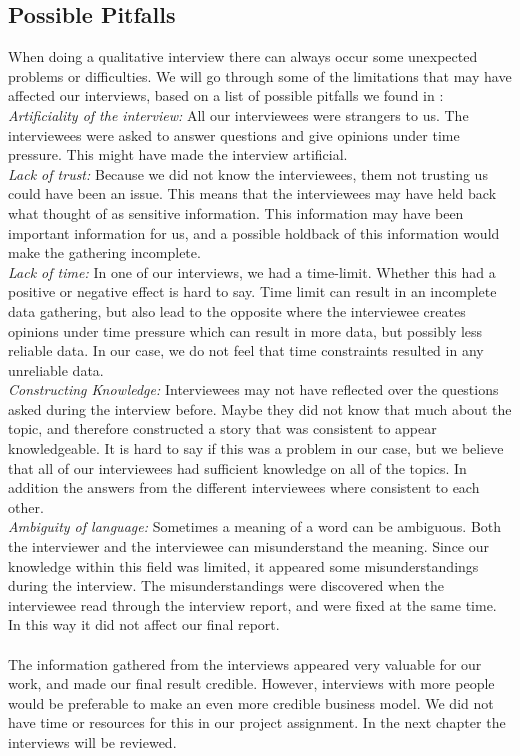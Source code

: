\subsection{Possible Pitfalls}
When doing a qualitative interview there can always occur some unexpected problems or difficulties. We will go through some of the limitations that may have affected our interviews, based on a list of possible pitfalls we found in \cite{interview}:\\
\emph{Artificiality of the interview:} All our interviewees were strangers to us. The interviewees were asked to answer questions  and give opinions under time pressure. This might have made the interview artificial. \\
\emph{Lack of trust:} Because we did not know the interviewees, them not trusting us could have been an issue. This means that the interviewees may have held back what thought of as sensitive information. This information may have been important information for us, and a possible holdback of this information would make the gathering incomplete. \\
\emph{Lack of time:} In one of our interviews, we had a time-limit. Whether this had a positive or negative effect is hard to say. Time limit can result in an incomplete data gathering, but also lead to the opposite where the interviewee creates opinions under time pressure which can result in more data, but possibly less reliable data. In our case, we do not feel that time constraints resulted in any unreliable data. \\
\emph{Constructing Knowledge:} Interviewees may not have reflected over the questions asked during the interview before. Maybe they did not know that much about the topic, and therefore constructed a story that was consistent to appear knowledgeable. It is hard to say if this was a problem in our case, but we believe that all of our interviewees had sufficient knowledge on all of the topics. In addition the answers from the different interviewees where consistent to each other. \\
\emph{Ambiguity of language:} Sometimes a meaning of a word can be ambiguous. Both the interviewer and the interviewee can misunderstand the meaning. Since our knowledge within this field was limited, it appeared some misunderstandings during the interview. The misunderstandings were discovered when the interviewee read through the interview report, and were fixed at the same time. In this way it did not affect our final report.  \\ \\
The information gathered from the interviews appeared very valuable for our work, and made our final result credible. However, interviews with more people would be preferable to make an even more credible business model. We did not have time or resources for this in our project assignment. In the next chapter the interviews will be reviewed.


